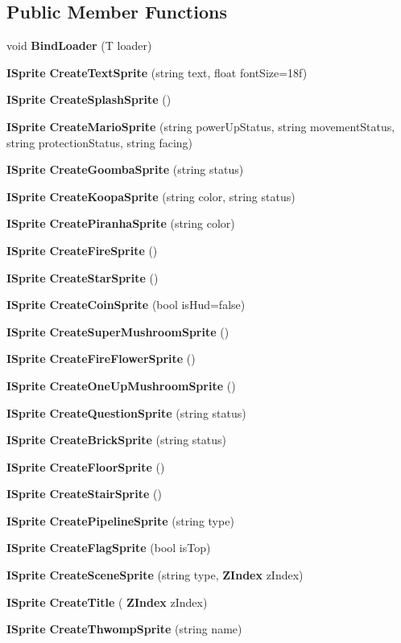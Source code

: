 \subsection*{Public Member Functions}
\begin{DoxyCompactItemize}
\item 
void \textbf{ Bind\+Loader} (T loader)
\item 
\textbf{ I\+Sprite} \textbf{ Create\+Text\+Sprite} (string text, float font\+Size=18f)
\item 
\textbf{ I\+Sprite} \textbf{ Create\+Splash\+Sprite} ()
\item 
\textbf{ I\+Sprite} \textbf{ Create\+Mario\+Sprite} (string power\+Up\+Status, string movement\+Status, string protection\+Status, string facing)
\item 
\textbf{ I\+Sprite} \textbf{ Create\+Goomba\+Sprite} (string status)
\item 
\textbf{ I\+Sprite} \textbf{ Create\+Koopa\+Sprite} (string color, string status)
\item 
\textbf{ I\+Sprite} \textbf{ Create\+Piranha\+Sprite} (string color)
\item 
\textbf{ I\+Sprite} \textbf{ Create\+Fire\+Sprite} ()
\item 
\textbf{ I\+Sprite} \textbf{ Create\+Star\+Sprite} ()
\item 
\textbf{ I\+Sprite} \textbf{ Create\+Coin\+Sprite} (bool is\+Hud=false)
\item 
\textbf{ I\+Sprite} \textbf{ Create\+Super\+Mushroom\+Sprite} ()
\item 
\textbf{ I\+Sprite} \textbf{ Create\+Fire\+Flower\+Sprite} ()
\item 
\textbf{ I\+Sprite} \textbf{ Create\+One\+Up\+Mushroom\+Sprite} ()
\item 
\textbf{ I\+Sprite} \textbf{ Create\+Question\+Sprite} (string status)
\item 
\textbf{ I\+Sprite} \textbf{ Create\+Brick\+Sprite} (string status)
\item 
\textbf{ I\+Sprite} \textbf{ Create\+Floor\+Sprite} ()
\item 
\textbf{ I\+Sprite} \textbf{ Create\+Stair\+Sprite} ()
\item 
\textbf{ I\+Sprite} \textbf{ Create\+Pipeline\+Sprite} (string type)
\item 
\textbf{ I\+Sprite} \textbf{ Create\+Flag\+Sprite} (bool is\+Top)
\item 
\textbf{ I\+Sprite} \textbf{ Create\+Scene\+Sprite} (string type, \textbf{ Z\+Index} z\+Index)
\item 
\textbf{ I\+Sprite} \textbf{ Create\+Title} (\textbf{ Z\+Index} z\+Index)
\item 
\textbf{ I\+Sprite} \textbf{ Create\+Thwomp\+Sprite} (string name)
\end{DoxyCompactItemize}


